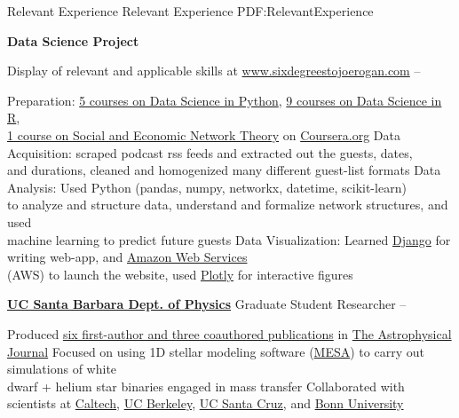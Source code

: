\documentclass[letterpaper,MMMyyyy,nonstopmode]{simpleresumecv}
\begin{document}
\begin{Body}

\Section
{Relevant Experience}
{Relevant Experience}
{PDF:RelevantExperience}

\Entry
\textbf{Data Science Project}

\Gap
\BulletItem
Display of relevant and applicable skills at \href{http://www.sixdegreestojoerogan.com/}{www.sixdegreestojoerogan.com}
\hfill
{} --
\begin{Detail}
\SubBulletItem
Preparation: \href{https://www.coursera.org/account/accomplishments/specialization/B76PZLXLQWK5}{5 courses on Data Science in Python}, \href{https://www.coursera.org/account/accomplishments/verify/KL2ZVYDPHTNG}{9 courses on Data Science in R},\\ \href{https://www.coursera.org/account/accomplishments/verify/TAMMMANEX3XH}{1 course on Social and Economic Network Theory} on \href{https://www.coursera.org/}{Coursera.org}
\SubBulletItem
Data Acquisition:
scraped podcast rss feeds and extracted out the guests, dates,\\
and durations, cleaned and homogenized many different guest-list formats
\SubBulletItem
Data Analysis:
Used Python (pandas, numpy, networkx, datetime, scikit-learn)\\
to analyze and structure data, understand and formalize network structures, and used\\
machine learning to predict future guests
\SubBulletItem
Data Visualization:
Learned \href{https://www.djangoproject.com/}{Django} for writing web-app, and \href{https://aws.amazon.com/}{Amazon Web Services}\\ (AWS) to launch the website, used \href{https://plot.ly/}{Plotly} for interactive figures\vspace{2mm}
\end{Detail}

\Entry
\href{http://web.physics.ucsb.edu/~astrogroup/}
{\textbf{UC Santa Barbara Dept. of Physics}}
\Gap
\BulletItem
Graduate Student Researcher
\hfill
{} --
\begin{Detail}
\SubBulletItem
Produced \href{http://adsabs.harvard.edu/cgi-bin/nph-abs_connect?library&libname=MyPapers&libid=561872b258}{six first-author and three coauthored publications} in \href{http://iopscience.iop.org/journal/0004-637X}{The Astrophysical Journal}
\SubBulletItem
Focused on using 1D stellar modeling software (\href{http://mesa.sourceforge.net/}{MESA}) to carry out simulations of white \\
dwarf + helium star binaries engaged in mass transfer
\SubBulletItem
Collaborated with scientists at \href{https://www.caltech.edu/}{Caltech}, \href{https://www.berkeley.edu/}{UC Berkeley}, \href{https://www.ucsc.edu}{UC Santa Cruz}, and \href{https://www.uni-bonn.de/}{Bonn University}\vspace{2mm}
\end{Detail}


\end{Body}
\end{document}
